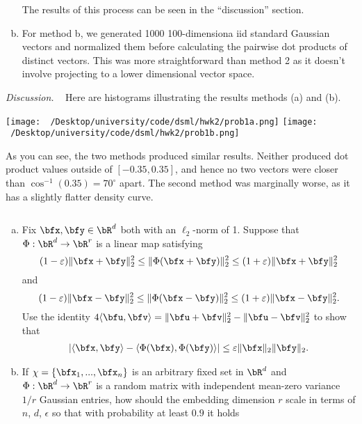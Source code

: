 \begin{homework}[e]
\begin{soln}
\begin{enumerate}[(a)]
        The results of this process can be seen in the ``discussion'' section.

      \item For method b, we generated 1000 100-dimensiona iid standard Gaussian vectors and normalized them before calculating the pairwise dot products of distinct vectors. This was more straightforward than method 2 as it doesn't involve projecting to a lower dimensional vector space.
    \end{enumerate}

    \emph{Discussion.} ~ Here are histograms illustrating the results methods (a) and (b).
    \begin{center}
      \texttt{[image: ~/Desktop/university/code/dsml/hwk2/prob1a.png]}
      \texttt{[image: ~/Desktop/university/code/dsml/hwk2/prob1b.png]}
      \label{fig:prob1}
    \end{center}
    As you can see, the two methods produced similar results. Neither produced dot product values outside of $[-0.35,0.35]$, and hence no two vectors were closer than $\cos^{-1}(0.35) = 70^\circ$ apart. The second method was marginally worse, as it has a slightly flatter density curve.
  \end{soln}
  \prob$ $
  \begin{enumerate}[(a)]
    \item Fix $\bfx, \bfy \in \bR^d$ both with an $\ell_2$-norm of 1. Suppose that $\Phi:\bR^d\to \bR^r$ is a linear map satisfying
      \begin{equation}\label{eqn:2.1}
        (1  - \epsilon)\|\bfx + \bfy\|_2^2 \leq \|\Phi(\bfx + \bfy)\|^2_2 \leq (1+\epsilon)\|\bfx + \bfy\|^2_2
      \end{equation}
      and
      \begin{equation}\label{eqn:2.2}
        (1  - \epsilon)\|\bfx - \bfy\|_2^2 \leq \|\Phi(\bfx - \bfy)\|^2_2 \leq (1+\epsilon)\|\bfx - \bfy\|^2_2.
      \end{equation}
      Use the identity $4\langle \bfu, \bfv \rangle = \|\bfu + \bfv\|^2_2 - \|\bfu-\bfv\|^2_2$ to show that
      \begin{align*}
        \left|\langle \bfx,\bfy \rangle - \langle \Phi(\bfx),\Phi(\bfy) \rangle \right|\leq \epsilon\|\bfx\|_2\|\bfy\|_2.
      \end{align*}
    \item If $\chi = \{\bfx_1,...,\bfx_n\}$ is an arbitrary fixed set in $\bR^d$ and $\Phi:\bR^d \to \bR^r$ is a random matrix with independent mean-zero variance $1/r$ Gaussian entries, how should the embedding dimension $r$ scale in terms of $n$, $d$, $\epsilon$ so that with probability at least $0.9$ it holds

\end{enumerate}
\end{homework}
